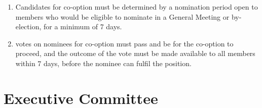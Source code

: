 \documentclass[a4paper,11pt,parskip=half-]{scrartcl} %
\begin{document}
\begin{enumerate}
        \item Candidates for co-option must be determined by a nomination period open to members who would be eligible to nominate in a General Meeting or by-election, for a minimum of 7 days.

        \item \exec votes on nominees for co-option must pass and be  for the co-option to proceed, and the outcome of the vote must be made available to all members within 7 days, before the nominee can fulfil the position.
    \end{enumerate}

\section{Executive Committee}\label{sec:exec}
\end{document}
